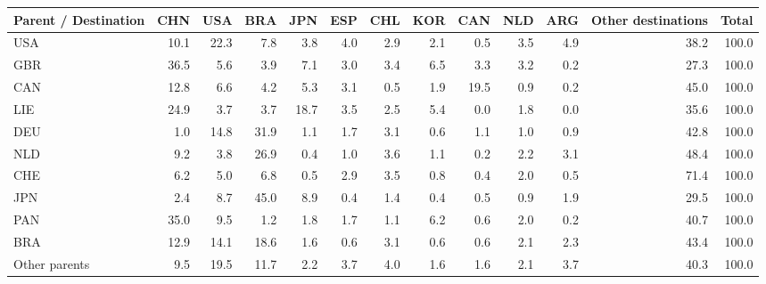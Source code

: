 \begin{tabular}{lrrrrrrrrrrrr}
\toprule
Parent / Destination & CHN & USA & BRA & JPN & ESP & CHL & KOR & CAN & NLD & ARG & Other destinations & Total \\
\midrule
USA & 10.1 & 22.3 & 7.8 & 3.8 & 4.0 & 2.9 & 2.1 & 0.5 & 3.5 & 4.9 & 38.2 & 100.0 \\
GBR & 36.5 & 5.6 & 3.9 & 7.1 & 3.0 & 3.4 & 6.5 & 3.3 & 3.2 & 0.2 & 27.3 & 100.0 \\
CAN & 12.8 & 6.6 & 4.2 & 5.3 & 3.1 & 0.5 & 1.9 & 19.5 & 0.9 & 0.2 & 45.0 & 100.0 \\
LIE & 24.9 & 3.7 & 3.7 & 18.7 & 3.5 & 2.5 & 5.4 & 0.0 & 1.8 & 0.0 & 35.6 & 100.0 \\
DEU & 1.0 & 14.8 & 31.9 & 1.1 & 1.7 & 3.1 & 0.6 & 1.1 & 1.0 & 0.9 & 42.8 & 100.0 \\
NLD & 9.2 & 3.8 & 26.9 & 0.4 & 1.0 & 3.6 & 1.1 & 0.2 & 2.2 & 3.1 & 48.4 & 100.0 \\
CHE & 6.2 & 5.0 & 6.8 & 0.5 & 2.9 & 3.5 & 0.8 & 0.4 & 2.0 & 0.5 & 71.4 & 100.0 \\
JPN & 2.4 & 8.7 & 45.0 & 8.9 & 0.4 & 1.4 & 0.4 & 0.5 & 0.9 & 1.9 & 29.5 & 100.0 \\
PAN & 35.0 & 9.5 & 1.2 & 1.8 & 1.7 & 1.1 & 6.2 & 0.6 & 2.0 & 0.2 & 40.7 & 100.0 \\
BRA & 12.9 & 14.1 & 18.6 & 1.6 & 0.6 & 3.1 & 0.6 & 0.6 & 2.1 & 2.3 & 43.4 & 100.0 \\
Other parents & 9.5 & 19.5 & 11.7 & 2.2 & 3.7 & 4.0 & 1.6 & 1.6 & 2.1 & 3.7 & 40.3 & 100.0 \\
\bottomrule
\end{tabular}
